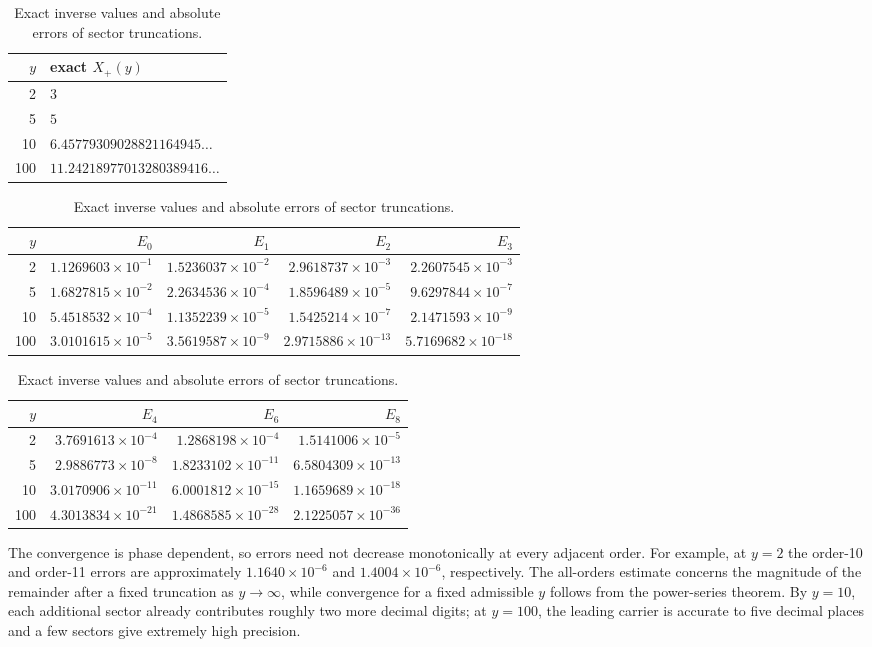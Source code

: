 \documentclass[11pt,oneside]{article}
\numberwithin{equation}{section}
\theoremstyle{plain}
\theoremstyle{definition}
\theoremstyle{remark}
\begin{document}
\begin{table}[H]
\centering
\caption{Exact inverse values and absolute errors of sector truncations.}
\label{tab:numerical-errors}
\small
\begin{tabular}{@{}r l@{}}
\toprule
\(y\) & exact \(X_+(y)\)\\
\midrule
2   & \(3\)\\
5   & \(5\)\\
10  & \(6.45779309028821164945\ldots\)\\
100 & \(11.24218977013280389416\ldots\)\\
\bottomrule
\end{tabular}

\medskip
\begin{tabular}{@{}r r r r r@{}}
\toprule
\(y\) & \(E_0\) & \(E_1\) & \(E_2\) & \(E_3\)\\
\midrule
2
& \(1.1269603\!\times10^{-1}\)
& \(1.5236037\!\times10^{-2}\)
& \(2.9618737\!\times10^{-3}\)
& \(2.2607545\!\times10^{-3}\)\\
5
& \(1.6827815\!\times10^{-2}\)
& \(2.2634536\!\times10^{-4}\)
& \(1.8596489\!\times10^{-5}\)
& \(9.6297844\!\times10^{-7}\)\\
10
& \(5.4518532\!\times10^{-4}\)
& \(1.1352239\!\times10^{-5}\)
& \(1.5425214\!\times10^{-7}\)
& \(2.1471593\!\times10^{-9}\)\\
100
& \(3.0101615\!\times10^{-5}\)
& \(3.5619587\!\times10^{-9}\)
& \(2.9715886\!\times10^{-13}\)
& \(5.7169682\!\times10^{-18}\)\\
\bottomrule
\end{tabular}

\medskip
\begin{tabular}{@{}r r r r@{}}
\toprule
\(y\) & \(E_4\) & \(E_6\) & \(E_8\)\\
\midrule
2
& \(3.7691613\!\times10^{-4}\)
& \(1.2868198\!\times10^{-4}\)
& \(1.5141006\!\times10^{-5}\)\\
5
& \(2.9886773\!\times10^{-8}\)
& \(1.8233102\!\times10^{-11}\)
& \(6.5804309\!\times10^{-13}\)\\
10
& \(3.0170906\!\times10^{-11}\)
& \(6.0001812\!\times10^{-15}\)
& \(1.1659689\!\times10^{-18}\)\\
100
& \(4.3013834\!\times10^{-21}\)
& \(1.4868585\!\times10^{-28}\)
& \(2.1225057\!\times10^{-36}\)\\
\bottomrule
\end{tabular}
\end{table}

The convergence is phase dependent, so errors need not decrease
monotonically at every adjacent order.  For example, at \(y=2\) the
order-10 and order-11 errors are approximately
\(1.1640\times10^{-6}\) and \(1.4004\times10^{-6}\), respectively.
The all-orders estimate concerns the magnitude of
the remainder after a fixed truncation as \(y\to\infty\), while convergence
for a fixed admissible \(y\) follows from the power-series theorem.  By
\(y=10\), each additional sector already contributes roughly two more
decimal digits; at \(y=100\), the leading carrier is accurate to five
decimal places and a few sectors give extremely high precision.
\end{document}

